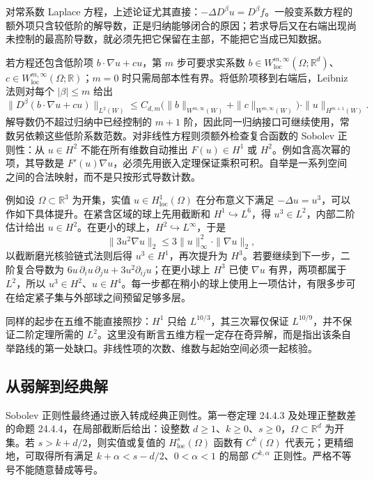 对常系数 Laplace 方程，上述论证尤其直接：\(-\Delta D^\beta u=D^\beta f\)。一般变系数方程的额外项只含较低阶的解导数，正是归纳能够闭合的原因；若求导后又在右端出现尚未控制的最高阶导数，就必须先把它保留在主部，不能把它当成已知数据。

\ProseParagraphBreak

若方程还包含低阶项 \(b\cdot\nabla u+cu\)，第 \(m\) 步可要求实系数
\(b\in W_{\mathrm{loc}}^{m,\infty}(\Omega;\mathbb R^d)\)、
\(c\in W_{\mathrm{loc}}^{m,\infty}(\Omega;\mathbb R)\)；\(m=0\) 时只需局部本性有界。将低阶项移到右端后，Leibniz 法则对每个 \(|\beta|\leq m\) 给出
\[
 \|D^\beta(b\cdot\nabla u+cu)\|_{L^2(W)}
 \leq C_{d,m}
 \bigl(\|b\|_{W^{m,\infty}(W)}+\|c\|_{W^{m,\infty}(W)}\bigr)
                    \cdot\|u\|_{H^{m+1}(W)}.
\]
解导数仍不超过归纳中已经控制的 \(m+1\) 阶，因此同一归纳接口可继续使用，常数另依赖这些低阶系数范数。对非线性方程则须额外检查复合函数的 Sobolev 正则性：从 \(u\in H^2\) 不能在所有维数自动推出 \(F(u)\in H^1\) 或 \(H^2\)。例如含高次幂的项，其导数是 \(F'(u)\nabla u\)，必须先用嵌入定理保证乘积可积。自举是一系列空间之间的合法映射，而不是只按形式导数计数。

例如设 \(\Omega\subset\mathbb R^3\) 为开集，实值 \(u\in H^1_{\mathrm{loc}}(\Omega)\) 在分布意义下满足 \(-\Delta u=u^3\)，可以作如下具体提升。在紧含区域的球上先用截断和 \(H^1\hookrightarrow L^6\)，得 \(u^3\in L^2\)，内部二阶估计给出 \(u\in H^2\)。在更小的球上，\(H^2\hookrightarrow L^\infty\)，于是
\[\|3u^2\nabla u\|_2\le3\|u\|_\infty^2\cdot\|\nabla u\|_2,\]
以截断磨光核验链式法则后得 \(u^3\in H^1\)，再次提升为 \(H^3\)。若要继续到下一步，二阶复合导数为 \(6u\,\partial_i u\,\partial_j u+3u^2\partial_{ij}u\)；在更小球上 \(H^3\) 已使 \(\nabla u\) 有界，两项都属于 \(L^2\)，所以 \(u^3\in H^2\)、\(u\in H^4\)。每一步都在稍小的球上使用上一项估计，有限多步可在给定紧子集与外部球之间预留足够多层。

同样的起步在五维不能直接照抄：\(H^1\) 只给 \(L^{10/3}\)，其三次幂仅保证 \(L^{10/9}\)，并不保证二阶定理所需的 \(L^2\)。这里没有断言五维方程一定存在奇异解，而是指出该条自举路线的第一处缺口。非线性项的次数、维数与起始空间必须一起核验。

\subsection{从弱解到经典解}
\label{b2:subsec:160203}

Sobolev 正则性最终通过嵌入转成经典正则性。第一卷定理 24.4.3 及处理正整数差的命题 24.4.4，在局部截断后给出：设整数 \(d\geq1\)、\(k\geq0\)、\(s\geq0\)，\(\Omega\subset\mathbb R^d\) 为开集。若 \(s>k+d/2\)，则实值或复值的 \(H_{\mathrm{loc}}^s(\Omega)\) 函数有 \(C^k(\Omega)\) 代表元；更精细地，可取得所有满足 \(k+\alpha<s-d/2\)、\(0<\alpha<1\) 的局部 \(C^{k,\alpha}\) 正则性。严格不等号不能随意替成等号。

